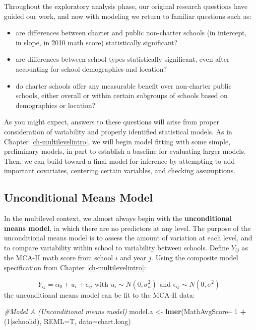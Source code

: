 \documentclass[
]{krantz}
\newenvironment{Shaded}{\begin{snugshade}}{\end{snugshade}}
\newcommand{\AttributeTok}[1]{\textcolor[rgb]{0.27,0.27,0.27}{#1}}
\newcommand{\CommentTok}[1]{\textcolor[rgb]{0.37,0.37,0.37}{\textit{#1}}}
\newcommand{\DecValTok}[1]{\textcolor[rgb]{0.06,0.06,0.06}{#1}}
\newcommand{\FunctionTok}[1]{\textcolor[rgb]{0.27,0.27,0.27}{\textbf{#1}}}
\newcommand{\NormalTok}[1]{#1}
\newcommand{\OtherTok}[1]{\textcolor[rgb]{0.37,0.37,0.37}{#1}}
\newcommand{\SpecialCharTok}[1]{\textcolor[rgb]{0.43,0.43,0.43}{\textbf{#1}}}
\providecommand{\tightlist}{%
  \setlength{\itemsep}{0pt}\setlength{\parskip}{0pt}}
\begin{document}
Throughout the exploratory analysis phase, our original research questions have guided our work, and now with modeling we return to familiar questions such as:

\begin{itemize}
\tightlist
\item
  are differences between charter and public non-charter schools (in intercept, in slope, in 2010 math score) statistically significant?
\item
  are differences between school types statistically significant, even after accounting for school demographics and location?
\item
  do charter schools offer any measurable benefit over non-charter public schools, either overall or within certain subgroups of schools based on demographics or location?
\end{itemize}

As you might expect, answers to these questions will arise from proper consideration of variability and properly identified statistical models.
As in Chapter \ref{ch-multilevelintro}, we will begin model fitting with some simple, preliminary models, in part to establish a baseline for evaluating larger models. Then, we can build toward a final model for inference by attempting to add important covariates, centering certain variables, and checking assumptions.

\subsection{Unconditional Means Model}\label{modela}

In the multilevel context, we almost always begin with the \textbf{unconditional means model},  in which there are no predictors at any level. The purpose of the unconditional means model is to assess the amount of variation at each level, and to compare variability within school to variability between schools. Define \(Y_{ij}\) as the MCA-II math score from school \(i\) and year \(j\). Using the composite model specification from Chapter \ref{ch-multilevelintro}:

\begin{equation*}
Y _{ij} = \alpha_{0} + u_{i} + \epsilon_{ij} \textrm{ with } u_{i} \sim N(0, \sigma^2_u) \textrm{ and } \epsilon_{ij} \sim N(0, \sigma^2)
\end{equation*}
the unconditional means model can be fit to the MCA-II data:

\begin{Shaded}
\begin{Highlighting}[]
\CommentTok{\#Model A (Unconditional means model)}
\NormalTok{model.a }\OtherTok{\textless{}{-}} \FunctionTok{lmer}\NormalTok{(MathAvgScore}\SpecialCharTok{\textasciitilde{}} \DecValTok{1} \SpecialCharTok{+}\NormalTok{ (}\DecValTok{1}\SpecialCharTok{|}\NormalTok{schoolid), }
                \AttributeTok{REML=}\NormalTok{T, }\AttributeTok{data=}\NormalTok{chart.long)}
\end{Highlighting}
\end{Shaded}
\end{document}
